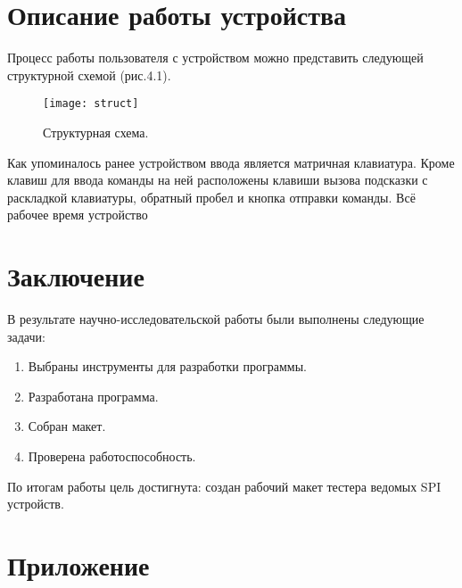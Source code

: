 \documentclass[14pt, oneside]{altsu-report}
\begin{document}
		
\chapter{Описание работы устройства}
	Процесс работы пользователя с устройством можно представить следующей структурной схемой (рис.4.1). 
	\begin{figure}[H]
	\begin{center}
	\texttt{[image: struct]} %
	\end{center}	
	\caption{Структурная схема.}
	\end{figure}	
	
	Как упоминалось ранее устройством ввода является матричная клавиатура. Кроме клавиш для ввода команды на ней расположены клавиши вызова подсказки с раскладкой клавиатуры, обратный пробел и кнопка отправки команды. Всё рабочее время устройство 


\chapter*{Заключение}
	В результате научно-исследовательской работы были выполнены следующие задачи:
	\begin{enumerate}
		\item Выбраны инструменты для разработки программы.
		\item Разработана программа.
		\item Собран макет.
		\item Проверена работоспособность.
	\end{enumerate}
	
	По итогам работы цель достигнута: создан рабочий макет тестера ведомых SPI устройств. 
\newpage
{}
\printbibliography[title={Список использованной литературы}] 

\newpage
\chapter*{\raggedleft\label{appendix1}Приложение}
\end{document}
